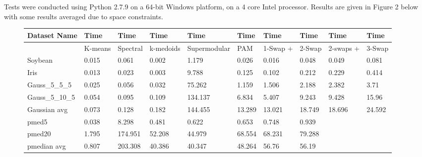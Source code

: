 \documentclass{article}
\begin{document}
Tests were conducted using Python 2.7.9 on a 64-bit Windows platform, on a 4 core Intel processor. Results are given in Figure 2  below with some results averaged due to space constraints. 

\begin{figure*}[h]
\label{fig:flat_results}
\small
\begin{tabular}{ | l | l | l | l | l | l | l | l | l | l | }
\hline
	Dataset Name & Time & Time & Time & Time & Time & Time & Time & Time & Time \\ \hline
	&K-means & Spectral & k-medoids & Supermodular & PAM & 1-Swap + & 2-Swap & 2-swaps + & 3-Swap  \\ \hline
	Soybean & 0.015 & 0.061 & 0.002 & 1.179 & 0.026 & 0.016 & 0.048 & 0.049 & 0.081 \\ 
	Iris & 0.013 & 0.023 & 0.003 & 9.788 & 0.125 & 0.102 & 0.212 & 0.229 & 0.414 \\ 
	Gauss\_5\_5\_5 & 0.025 & 0.056 & 0.032 & 75.262 & 1.159 & 1.506 & 2.188 & 2.382 & 3.71 \\ 
	Gauss\_5\_10\_5 & 0.054 & 0.095 & 0.109 & 134.137 & 6.834 & 5.407 & 9.243 & 9.428 & 15.96 \\ 
	Gaussian avg & 0.073 & 0.128 & 0.182 & 144.455 & 13.289 & 13.021 & 18.749 & 18.696 & 24.592 \\ 
	pmed5 & 0.038 & 8.298 & 0.481 & 0.622 & 0.653 & 0.748 & 0.939 & \  & \  \\ 
	pmed20 & 1.795 & 174.951 & 52.208 & 44.979 & 68.554 & 68.231 & 79.288 & \  & \  \\ 
	pmedian avg & 0.807 & 203.308 & 40.386 & 40.347 & 48.264 & 56.76 & 56.19 & \  & \  \\ \hline
\end{tabular}
\vspace{0.2 cm}


\end{figure*}
\end{document}
